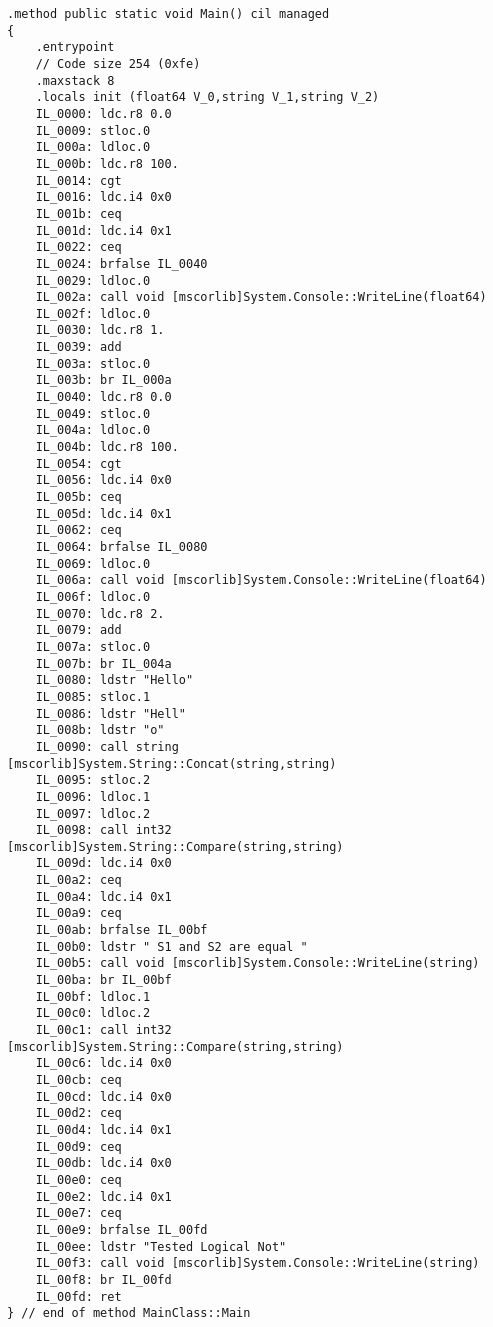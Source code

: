 \lstset{style=csharp}
\begin{lstlisting}
.method public static void Main() cil managed
{
	.entrypoint
	// Code size 254 (0xfe)
	.maxstack 8
	.locals init (float64 V_0,string V_1,string V_2)
	IL_0000: ldc.r8 0.0
	IL_0009: stloc.0
	IL_000a: ldloc.0
	IL_000b: ldc.r8 100.
	IL_0014: cgt
	IL_0016: ldc.i4 0x0
	IL_001b: ceq
	IL_001d: ldc.i4 0x1
	IL_0022: ceq
	IL_0024: brfalse IL_0040
	IL_0029: ldloc.0
	IL_002a: call void [mscorlib]System.Console::WriteLine(float64)
	IL_002f: ldloc.0
	IL_0030: ldc.r8 1.
	IL_0039: add
	IL_003a: stloc.0
	IL_003b: br IL_000a
	IL_0040: ldc.r8 0.0
	IL_0049: stloc.0
	IL_004a: ldloc.0
	IL_004b: ldc.r8 100.
	IL_0054: cgt
	IL_0056: ldc.i4 0x0
	IL_005b: ceq
	IL_005d: ldc.i4 0x1
	IL_0062: ceq
	IL_0064: brfalse IL_0080
	IL_0069: ldloc.0
	IL_006a: call void [mscorlib]System.Console::WriteLine(float64)
	IL_006f: ldloc.0
	IL_0070: ldc.r8 2.
	IL_0079: add
	IL_007a: stloc.0
	IL_007b: br IL_004a
	IL_0080: ldstr "Hello"
	IL_0085: stloc.1
	IL_0086: ldstr "Hell"
	IL_008b: ldstr "o"
	IL_0090: call string [mscorlib]System.String::Concat(string,string)
	IL_0095: stloc.2
	IL_0096: ldloc.1
	IL_0097: ldloc.2
	IL_0098: call int32 [mscorlib]System.String::Compare(string,string)
	IL_009d: ldc.i4 0x0
	IL_00a2: ceq
	IL_00a4: ldc.i4 0x1
	IL_00a9: ceq
	IL_00ab: brfalse IL_00bf
	IL_00b0: ldstr " S1 and S2 are equal "
	IL_00b5: call void [mscorlib]System.Console::WriteLine(string)
	IL_00ba: br IL_00bf
	IL_00bf: ldloc.1
	IL_00c0: ldloc.2
	IL_00c1: call int32 [mscorlib]System.String::Compare(string,string)
	IL_00c6: ldc.i4 0x0
	IL_00cb: ceq
	IL_00cd: ldc.i4 0x0
	IL_00d2: ceq
	IL_00d4: ldc.i4 0x1
	IL_00d9: ceq
	IL_00db: ldc.i4 0x0
	IL_00e0: ceq
	IL_00e2: ldc.i4 0x1
	IL_00e7: ceq
	IL_00e9: brfalse IL_00fd
	IL_00ee: ldstr "Tested Logical Not"
	IL_00f3: call void [mscorlib]System.Console::WriteLine(string)
	IL_00f8: br IL_00fd
	IL_00fd: ret
} // end of method MainClass::Main
\end{lstlisting}